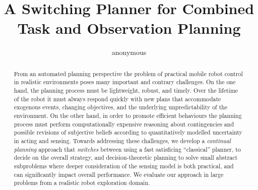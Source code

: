 \documentclass[letterpaper]{article}
\title{A Switching Planner for Combined Task and Observation Planning}
\author{anonymous}
\begin{document}
 
\maketitle

\begin{abstract}


From an automated planning perspective the problem of practical mobile
robot control in realistic environments poses many important and
contrary challenges.  On the one hand, the planning process must be
lightweight, robust, and timely. Over the lifetime of the robot it
must always respond quickly with new plans that accommodate exogenous
events, changing objectives, and the underlying unpredictability of
the environment.  On the other hand, in order to promote efficient
behaviours the planning process must perform computationally expensive
reasoning about contingencies and possible revisions of subjective
beliefs according to quantitatively modelled uncertainty in acting and
sensing.
Towards addressing these challenges, we develop a \emph{continual
planning} approach that {\em switches} between using a fast
satisficing ``classical'' planner, to decide on the overall strategy,
and decision-theoretic planning to solve small abstract subproblems where
deeper consideration of the sensing model is both practical, and can
significantly impact overall performance. We evaluate our approach
in large problems from a realistic robot exploration domain.






\end{abstract}

\end{document}
